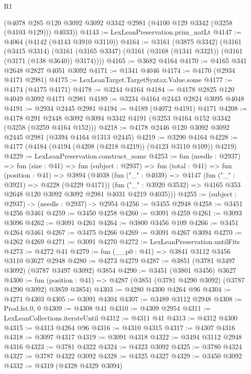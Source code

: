 \begin{lexlean}{R1}
\begin{coremodule}
      (@4078 @285 @120 @3092 @3092 @3342 @2981 (@4100 @129 @3342 (@3258 (@4103 @129))) @4033))
@4143 := LexLeanPreservation.prim_natLt
@4147 := @4064 (@4142 (@4143 @3910 @3110))
@4164 := @3161
    (@3875 @3342)
    (@3161
      (@3415 @3314)
      (@3161 (@3165 @3347) (@3161 (@3168 (@1341 @3321)) (@3161 (@3171 (@138 @3640)) @3174))))
@4165 := @3682 @4164
@4170 := @4165 @341 @2648 @2827 @4051 @3092
@4171 := @1341 @4046
@4174 := @4170 (@2934 @4171 @2981)
@4175 := LexLeanTarget.TargetSyntax.Value.some
@4177 := @4174 (@4175 @4171)
@4178 := @3244 @4164
@4184 := @4178 @2825 @120 @4049 @3092 @4171 @2981
@4189 := @3234 @4164 @2443 @2824 @3095 @4048
@4191 := @2934 @2445 @2981
@4194 := @4189 (@4072 @4191) @4171
@4208 := @4178
    @291
    @2448
    @3092
    @3094
    @3342
    @4191
    (@3253 @4164 @152 @3342 (@3258 (@3259 @4164 @152)))
@4218 := @4178 @2446 @120 @3092 @3092 @2445 @2981 (@3394 @4164 @1313 @2445)
@4219 := @3290 @4164
@4228 := @4177 (@4184 (@4194 (@4208 (@4218 @4219)) (@4123 @3110 @109)) @4219)
@4229 := LexLeanPreservation.construct_some
@4253 := fun (needle : @2937) =>
  fun (size : @41) =>
  fun (subject : @2937) =>
  fun (total : @41) =>
  fun (position : @41) =>
  @3894
    (@4038
      (fun ("_" : @4039) =>
      @4147
        (fun ("_" : @3921) => @4228 (@4229 @4171))
        (fun ("_" : @3920 @3532) => @4165 @353 @2648 @120 @3092 @3092 @2981 @4031 @4219 @4035)))
@4255 := (subject : @2937) -> (needle : @2937) -> @2954
@4256 := @3455 @2948
@4258 := @3451 @4256 @3461
@4259 := @3450 @4258
@4260 := @3091 @4259
@4261 := @3093 @3096
@4262 := @3091 @4261
@4264 := @3800 @3456 @109
@4266 := @3451 @4264 @3461
@4267 := @3475 @4266
@4269 := @3091 @4267 @3094
@4270 := @4262 @4269
@4271 := @3091 @4270
@4272 := LexLeanPreservation.untilFits
@4273 := @4272 @41
@4279 := fun (__p0 : @41) => @3841 @3112 @3456 @3110 @3627 @2948
@4280 := @4273 @4279
@4287 := @3851 (@3781 @3497 @3092) (@3787 @3497 @3092) @3854
@4290 := @3451 (@3801 @3456) @3627
@4300 := fun (position : @41) => @4287 (@3851 (@3781 @4290 @3092) (@3787 @4290 @3092) @3859 @3854)
@4303 := @4280 @4300 @4264 @96
@4304 := @4271 @4303
@4305 := @3091 @4304
@4307 := @3489 @3112 @2948
@4308 := Prod.fst.{0, 0}
@4309 := @4308 @41
@4310 := @4309 @2954
@4311 := LexLeanCollections.iterateUntil
@4312 := @4311 @41
@4313 := @4312 @4300
@4315 := @4313 @4264 @96
@4316 := @4310 @4315
@4317 := @4307 @4316
@4318 := @3097 @4317
@4319 := @3091 @4318
@4322 := @3494 @3112 @2948 @4316
@4323 := @3781 @4322
@4324 := @4323 @3092
@4325 := @3780 @4324
@4327 := @3787 @4322 @3092
@4328 := @4325 @4327
@4329 := @3450 @3092
@4332 := @4319 (@4328 @4329 @3094)

\end{coremodule}
\end{lexlean}
